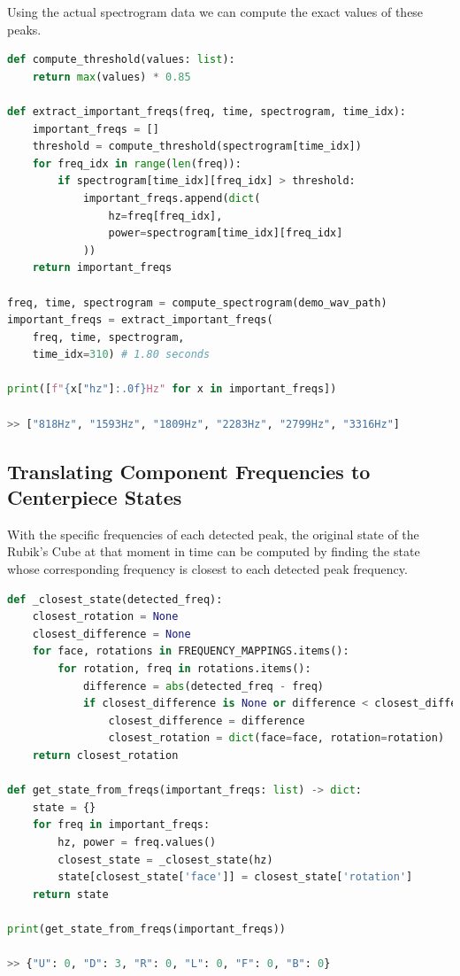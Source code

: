 Using the actual spectrogram data we can compute the exact values of these peaks.
\begin{lstlisting}[language=Python]
def compute_threshold(values: list):
    return max(values) * 0.85

def extract_important_freqs(freq, time, spectrogram, time_idx):
    important_freqs = []
    threshold = compute_threshold(spectrogram[time_idx])
    for freq_idx in range(len(freq)):
        if spectrogram[time_idx][freq_idx] > threshold:
            important_freqs.append(dict(
                hz=freq[freq_idx],
                power=spectrogram[time_idx][freq_idx]
            ))
    return important_freqs

freq, time, spectrogram = compute_spectrogram(demo_wav_path)
important_freqs = extract_important_freqs(
    freq, time, spectrogram,
    time_idx=310) # 1.80 seconds

print([f"{x["hz"]:.0f}Hz" for x in important_freqs])

>> ["818Hz", "1593Hz", "1809Hz", "2283Hz", "2799Hz", "3316Hz"]
\end{lstlisting}

\newpage
\subsection{Translating Component Frequencies to Centerpiece States}
\label{subsec:translating-freqs-to-state}
With the specific frequencies of each detected peak, the original state of the Rubik's Cube at that moment in time can be computed by finding the state whose corresponding frequency is closest to each detected peak frequency.

\begin{lstlisting}[language=Python]
def _closest_state(detected_freq):
    closest_rotation = None
    closest_difference = None
    for face, rotations in FREQUENCY_MAPPINGS.items():
        for rotation, freq in rotations.items():
            difference = abs(detected_freq - freq)
            if closest_difference is None or difference < closest_difference:
                closest_difference = difference
                closest_rotation = dict(face=face, rotation=rotation)
    return closest_rotation

def get_state_from_freqs(important_freqs: list) -> dict:
    state = {}
    for freq in important_freqs:
        hz, power = freq.values()
        closest_state = _closest_state(hz)
        state[closest_state['face']] = closest_state['rotation']
    return state

print(get_state_from_freqs(important_freqs))

>> {"U": 0, "D": 3, "R": 0, "L": 0, "F": 0, "B": 0}
\end{lstlisting}

